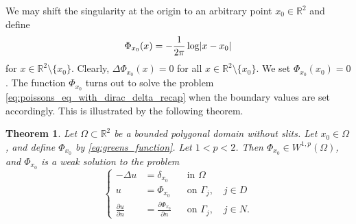 \documentclass[english, 12pt, a4paper, sci, utf8, a-2b, online]{aaltothesis}
\theoremstyle{definition}
\theoremstyle{plain}
\newtheorem{theorem}{Theorem}[section]
\DeclarePairedDelimiter\abs{\lvert}{\rvert}
\numberwithin{equation}{section}
\begin{document}
We may shift the singularity at the origin to an arbitrary point
$x_0 \in \mathbb{R}^2$ and define
\begin{equation}
    \label{eq:greens_function}
    \Phi_{x_0}(x) = -\frac{1}{2 \pi} \log \abs{x - x_0}
\end{equation}
for $x \in \mathbb{R}^2 \setminus \{ x_0 \}$.
Clearly, $\Delta \Phi_{x_0}(x) = 0$ for all $x \in \mathbb{R}^2 \setminus \{x_0\}$.
We set $\Phi_{x_0}(x_0) = 0$.
The function $\Phi_{x_0}$ turns out to solve the problem 
\eqref{eq:poissons_eq_with_dirac_delta_recap} when the boundary values
are set accordingly.
This is illustrated by the following theorem.
\begin{theorem}
    \label{thm:greens_function_is_solution}
    Let $\Omega \subset \mathbb{R}^2$ be a bounded polygonal domain without slits.
    Let $x_0 \in \Omega$, and define $\Phi_{x_0}$ by \eqref{eq:greens_function}.
    Let $1 < p < 2$. Then $\Phi_{x_0} \in W^{1,p}(\Omega)$,
    and $\Phi_{x_0}$ is a weak solution to the problem
    \begin{equation}
        \label{eq:greens_function_is_solution_problem}
        \left\{
            \begin{aligned}
                -\Delta u &= \delta_{x_0} && \text{in } \Omega \\
                u &= \Phi_{x_0} && \text{on } \Gamma_j, \quad j \in D \\
                \frac{\partial u}{\partial n} &=
                \frac{\partial \Phi_{x_0}}{\partial n} && \text{on } \Gamma_j,
                \quad j \in N.
            \end{aligned}
        \right.
    \end{equation}
\end{theorem}
\end{document}
